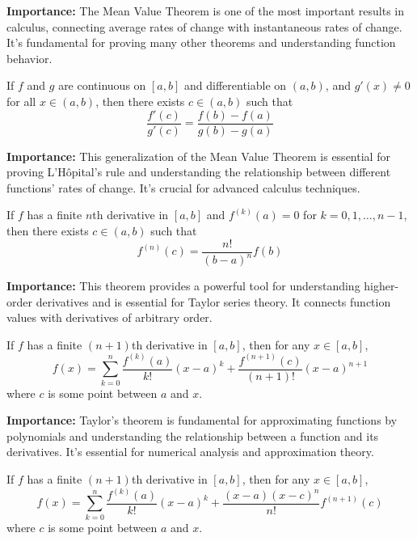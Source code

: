 \noindent\textbf{Importance:} The Mean Value Theorem is one of the most important results in calculus, connecting average rates of change with instantaneous rates of change. It's fundamental for proving many other theorems and understanding function behavior.



\begin{theorem}
If $f$ and $g$ are continuous on $[a,b]$ and differentiable on $(a,b)$, and $g'(x) \neq 0$ for all $x \in (a,b)$, then there exists $c \in (a,b)$ such that
\[ \frac{f'(c)}{g'(c)} = \frac{f(b) - f(a)}{g(b) - g(a)} \]
\end{theorem}

\noindent\textbf{Importance:} This generalization of the Mean Value Theorem is essential for proving L'Hôpital's rule and understanding the relationship between different functions' rates of change. It's crucial for advanced calculus techniques.



\begin{theorem}
If $f$ has a finite $n$th derivative in $[a,b]$ and $f^{(k)}(a) = 0$ for $k = 0, 1, \ldots, n-1$, then there exists $c \in (a,b)$ such that
\[ f^{(n)}(c) = \frac{n!}{(b-a)^n} f(b) \]
\end{theorem}

\noindent\textbf{Importance:} This theorem provides a powerful tool for understanding higher-order derivatives and is essential for Taylor series theory. It connects function values with derivatives of arbitrary order.



\begin{theorem}
If $f$ has a finite $(n+1)$th derivative in $[a,b]$, then for any $x \in [a,b]$,
\[ f(x) = \sum_{k=0}^{n} \frac{f^{(k)}(a)}{k!} (x-a)^k + \frac{f^{(n+1)}(c)}{(n+1)!} (x-a)^{n+1} \]
where $c$ is some point between $a$ and $x$.
\end{theorem}

\noindent\textbf{Importance:} Taylor's theorem is fundamental for approximating functions by polynomials and understanding the relationship between a function and its derivatives. It's essential for numerical analysis and approximation theory.



\begin{theorem}
If $f$ has a finite $(n+1)$th derivative in $[a,b]$, then for any $x \in [a,b]$,
\[ f(x) = \sum_{k=0}^{n} \frac{f^{(k)}(a)}{k!} (x-a)^k + \frac{(x-a)(x-c)^n}{n!} f^{(n+1)}(c) \]
where $c$ is some point between $a$ and $x$.
\end{theorem}

